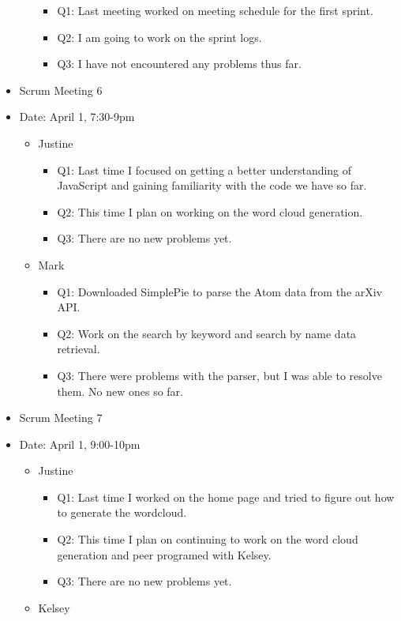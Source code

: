 \documentclass[]{article}
\begin{document}
\begin{itemize}
\begin{itemize}
    \begin{itemize}
    \itemsep1pt\parskip0pt
    \item
      Q1: Last meeting worked on meeting schedule for the first sprint.
    \item
      Q2: I am going to work on the sprint logs.
    \item
      Q3: I have not encountered any problems thus far.
    \end{itemize}
  \end{itemize}
\item
  Scrum Meeting 6
\item
  Date: April 1, 7:30-9pm

  \begin{itemize}
  \itemsep1pt\parskip0pt
  \item
    Justine

    \begin{itemize}
    \itemsep1pt\parskip0pt
    \item
      Q1: Last time I focused on getting a better understanding of
      JavaScript and gaining familiarity with the code we have so far.
    \item
      Q2: This time I plan on working on the word cloud generation.
    \item
      Q3: There are no new problems yet.
    \end{itemize}
  \item
    Mark

    \begin{itemize}
    \itemsep1pt\parskip0pt
    \item
      Q1: Downloaded SimplePie to parse the Atom data from the arXiv
      API.
    \item
      Q2: Work on the search by keyword and search by name data
      retrieval.
    \item
      Q3: There were problems with the parser, but I was able to resolve
      them. No new ones so far.
    \end{itemize}
  \end{itemize}
\item
  Scrum Meeting 7
\item
  Date: April 1, 9:00-10pm

  \begin{itemize}
  \itemsep1pt\parskip0pt
  \item
    Justine

    \begin{itemize}
    \itemsep1pt\parskip0pt
    \item
      Q1: Last time I worked on the home page and tried to figure out
      how to generate the wordcloud.
    \item
      Q2: This time I plan on continuing to work on the word cloud
      generation and peer programed with Kelsey.
    \item
      Q3: There are no new problems yet.
    \end{itemize}
  \item
    Kelsey


\end{itemize}
\end{itemize}
\end{document}

